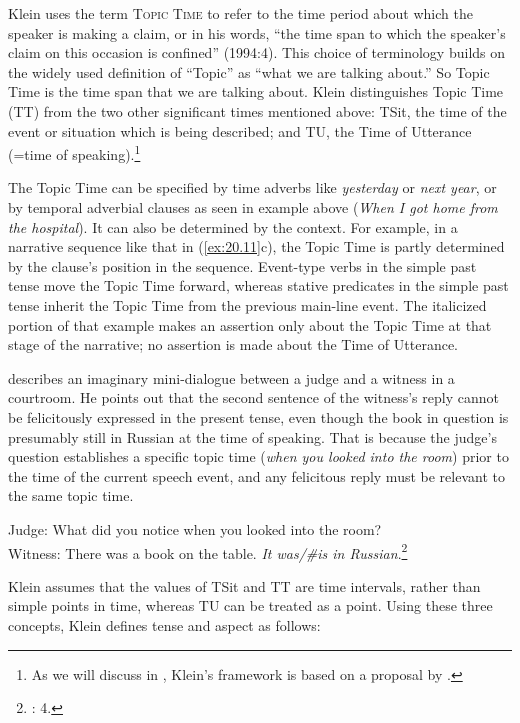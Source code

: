 Klein uses the term \textsc{Topic Time} to refer to the time period about which the speaker is making a claim, or in his words, “the time span to which the speaker’s claim on this occasion is confined” (1994:4). This choice of terminology builds on the widely used definition of “Topic” as “what we are talking about.” So Topic Time is the time span that we are talking about. Klein distinguishes Topic Time (TT) from the two other significant times mentioned above: TSit, the time of the event or situation which is being described; and TU, the Time of Utterance (=time of speaking).\footnote{As we will discuss in , Klein’s framework is based on a proposal by \citet[§51]{Reichenbach1947}.}



The Topic Time can be specified by time adverbs like \textit{yesterday} or \textit{next year}, or by temporal adverbial clauses as seen in example  above (\textit{When I got home from the hospital}). It can also be determined by the context. For example, in a narrative sequence like that in (\ref{ex:20.11}c), the Topic Time is partly determined by the clause’s position in the sequence. Event-type verbs in the simple past tense move the Topic Time forward, whereas stative predicates in the simple past tense inherit the Topic Time from the previous main-line event. The italicized portion of that example makes an assertion only about the Topic Time at that stage of the narrative; no assertion is made about the Time of Utterance.



\citet[4]{Klein1994} describes an imaginary mini-dialogue between a judge and a witness in a courtroom. He points out that the second sentence of the witness’s reply cannot be felicitously expressed in the present tense, even though the book in question is presumably still in {Russian} at the time of speaking. That is because the judge’s question establishes a specific topic time (\textit{when you looked into the room}) prior to the time of the current speech event, and any felicitous reply must be relevant to the same topic time.


\ea \label{ex:20.12}
Judge: What did you notice when you looked into the room?\\
Witness: There was a book on the table. \textit{It was/\#is in Russian}.\footnote{\citealt{Klein1994}: 4.}
\z


Klein assumes that the values of TSit and TT are time intervals, rather than simple points in time, whereas TU can be treated as a point. Using these three concepts, Klein defines tense and aspect as follows:


